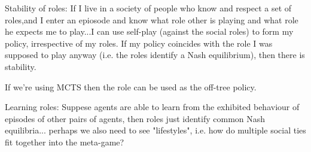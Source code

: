 \documentclass[a4paper]{article}
\begin{document}
Stability of roles: If I live in a society of people who know and respect a set of roles,and I enter an epiosode and know what role other is playing and what role he expects me to play...I can use self-play (against the social roles) to form my policy, irrespective of my roles. If my policy coincides with the role I was supposed to play anyway (i.e. the roles identify a Nash equilibrium), then there is stability.

If we're using MCTS then the role can be used as the off-tree policy.

Learning roles: Suppese agents are able to learn from the exhibited behaviour of episodes of other pairs of agents, then roles just identify common Nash equilibria... perhaps we also need to see "lifestyles", i.e. how do multiple social ties fit together into the meta-game?
 

\end{document}
